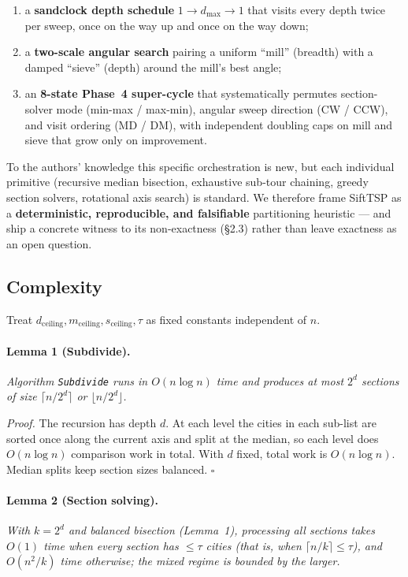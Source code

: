 \documentclass[11pt,a4paper]{article}
\begin{document}
\begin{enumerate}
\item a \textbf{sandclock depth schedule} $1 \to d_{\max} \to 1$ that
visits every depth twice per sweep, once on the way up and once on the
way down;
\item a \textbf{two-scale angular search} pairing a uniform ``mill''
(breadth) with a damped ``sieve'' (depth) around the mill's best
angle;
\item an \textbf{8-state Phase~4 super-cycle} that systematically
permutes section-solver mode (min-max / max-min), angular sweep
direction (CW / CCW), and visit ordering (MD / DM), with independent
doubling caps on mill and sieve that grow only on improvement.
\end{enumerate}

To the authors' knowledge this specific orchestration is new, but each
individual primitive (recursive median bisection, exhaustive sub-tour
chaining, greedy section solvers, rotational axis search) is standard.
We therefore frame SiftTSP as a \textbf{deterministic, reproducible,
and falsifiable} partitioning heuristic --- and ship a concrete witness
to its non-exactness (\S2.3) rather than leave exactness as an open
question.

\subsection{Complexity}

Treat $d_{\text{ceiling}}, m_{\text{ceiling}}, s_{\text{ceiling}}, \tau$
as fixed constants independent of $n$.

\paragraph{Lemma 1 (Subdivide).} \textit{Algorithm \texttt{Subdivide}
runs in $O(n \log n)$ time and produces at most $2^d$ sections of size
$\lceil n/2^d \rceil$ or $\lfloor n/2^d \rfloor$.}

\textit{Proof.} The recursion has depth $d$. At each level the cities
in each sub-list are sorted once along the current axis and split at
the median, so each level does $O(n \log n)$ comparison work in total.
With $d$ fixed, total work is $O(n \log n)$. Median splits keep section
sizes balanced. $\square$

\paragraph{Lemma 2 (Section solving).} \textit{With $k = 2^d$ and
balanced bisection (Lemma~1), processing all sections takes $O(1)$ time
when every section has $\leq \tau$ cities (that is, when
$\lceil n/k \rceil \leq \tau$), and $O(n^2 / k)$ time otherwise; the
mixed regime is bounded by the larger.}
\end{document}
